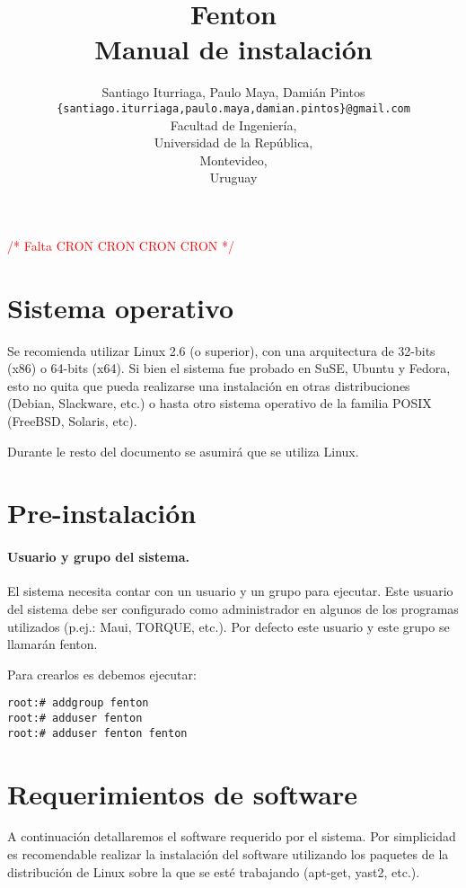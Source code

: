 \documentclass[a4paper,10pt,spanish]{article}
\title{Fenton\\Manual de instalaci\'{o}n}
\author{Santiago Iturriaga, Paulo Maya, Dami\'{a}n Pintos\\
\texttt{\{santiago.iturriaga,paulo.maya,damian.pintos\}@gmail.com}\\
Facultad de Ingenier\'{i}a,\\
Universidad de la Rep\'{u}blica,\\
Montevideo,\\
Uruguay}
\date{}
\begin{document}
\maketitle
\tableofcontents{}

\textcolor{red}{\Large /{*} Falta CRON CRON CRON CRON {*}/}

\section{Sistema operativo}

Se recomienda utilizar Linux 2.6 (o superior), con una arquitectura de 32-bits (x86) o 64-bits (x64). Si bien el sistema fue probado en SuSE, Ubuntu y Fedora, esto no quita que pueda realizarse una instalaci\'{o}n en otras distribuciones (Debian, Slackware, etc.) o hasta otro sistema operativo de la familia POSIX (FreeBSD, Solaris, etc).

Durante le resto del documento se asumir\'{a} que se utiliza Linux.

\section{Pre-instalaci\'{o}n}

\paragraph{Usuario y grupo del sistema.}

El sistema necesita contar con un usuario y un grupo para ejecutar. Este usuario del sistema debe ser configurado como administrador en algunos de los programas utilizados (p.ej.: Maui, TORQUE, etc.). Por defecto este usuario y este grupo se llamar\'{a}n fenton.

Para crearlos es debemos ejecutar:

\begin{verbatim}
root:# addgroup fenton
root:# adduser fenton
root:# adduser fenton fenton
\end{verbatim}

\section{Requerimientos de software}

A continuaci\'{o}n detallaremos el software requerido por el sistema. Por simplicidad es recomendable realizar la instalaci\'{o}n del software utilizando los paquetes de la distribuci\'{o}n de Linux sobre la que se est\'{e} trabajando (apt-get, yast2, etc.).
\end{document}

